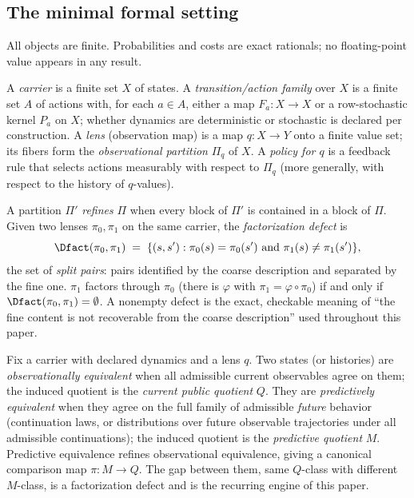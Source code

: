 \subsection{The minimal formal setting}
\label{sec:setting}

All objects are finite. Probabilities and costs are exact rationals; no
floating-point value appears in any result.

\begin{definition}
A \emph{carrier} is a finite set $X$ of states. A \emph{transition/action
family} over $X$ is a finite set $A$ of actions with, for each $a\in A$,
either a map $F_a : X \to X$ or a row-stochastic kernel $P_a$ on $X$; whether
dynamics are deterministic or stochastic is declared per construction. A
\emph{lens} (observation map) is a map $q : X \to Y$ onto a finite value set;
its fibers form the \emph{observational partition} $\Pi_q$ of $X$. A
\emph{policy for $q$} is a feedback rule that selects actions measurably with
respect to $\Pi_q$ (more generally, with respect to the history of $q$-values).
\end{definition}

\begin{definition}
A partition $\Pi'$ \emph{refines} $\Pi$ when every block of $\Pi'$ is contained
in a block of $\Pi$. Given two lenses $\pi_0, \pi_1$ on the same carrier, the
\emph{factorization defect} is
\[
\Dfact(\pi_0,\pi_1) \;=\; \{(s,s') : \pi_0(s)=\pi_0(s') \text{ and }
\pi_1(s)\neq\pi_1(s')\},
\]
the set of \emph{split pairs}: pairs identified by the coarse description and
separated by the fine one. $\pi_1$ factors through $\pi_0$ (there is $\varphi$
with $\pi_1=\varphi\circ\pi_0$) if and only if $\Dfact(\pi_0,\pi_1)=\emptyset$.
A nonempty defect is the exact, checkable meaning of ``the fine content is not
recoverable from the coarse description'' used throughout this paper.
\end{definition}

\begin{definition}
Fix a carrier with declared dynamics and a lens $q$. Two states (or histories)
are \emph{observationally equivalent} when all admissible current observables
agree on them; the induced quotient is the \emph{current public quotient} $Q$.
They are \emph{predictively equivalent} when they agree on the full family of
admissible \emph{future} behavior (continuation laws, or distributions over
future observable trajectories under all admissible continuations); the induced
quotient is the \emph{predictive quotient} $M$. Predictive equivalence refines
observational equivalence, giving a canonical comparison map $\pi : M \to Q$.
The gap between them, same $Q$-class with different $M$-class, is a
factorization defect and is the recurring engine of this paper.
\end{definition}

